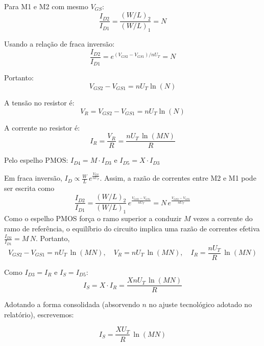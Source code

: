\documentclass[12pt,a4paper]{article}
\begin{document}
Para M1 e M2 com mesmo $V_{GS}$:
\begin{equation*}
\frac{I_{D2}}{I_{D1}} = \frac{(W/L)_2}{(W/L)_1} = N
\end{equation*}

Usando a relação de fraca inversão:
\begin{equation*}
\frac{I_{D2}}{I_{D1}} = e^{(V_{GS2} - V_{GS1})/nU_T} = N
\end{equation*}

Portanto:
\begin{equation*}
V_{GS2} - V_{GS1} = nU_T \ln(N)
\end{equation*}

A tensão no resistor é:
\begin{equation*}
V_R = V_{GS2} - V_{GS1} = nU_T \ln(N)
\end{equation*}

A corrente no resistor é:
\begin{equation*}
I_R = \frac{V_R}{R} = \frac{nU_T \,\ln(MN)}{R}
\end{equation*}

Pelo espelho PMOS: $I_{D4} = M \cdot I_{D3}$ e $I_{D5} = X \cdot I_{D3}$

Em fraca inversão, $I_D \propto \tfrac{W}{L}\,e^{\tfrac{V_{GS}}{nU_T}}$. Assim, a razão de correntes entre M2 e M1 pode ser escrita como
\begin{equation}
\frac{I_{D2}}{I_{D1}} = \frac{(W/L)_2}{(W/L)_1}\,e^{\tfrac{V_{GS2}-V_{GS1}}{nU_T}} = N\,e^{\tfrac{V_{GS2}-V_{GS1}}{nU_T}}
\end{equation}
Como o espelho PMOS força o ramo superior a conduzir $M$ vezes a corrente do ramo de referência, o equilíbrio do circuito implica uma razão de correntes efetiva $\tfrac{I_{D2}}{I_{D1}}=M\,N$. Portanto,
\begin{equation}
V_{GS2}-V_{GS1} = nU_T\,\ln(MN), \quad V_R = nU_T\,\ln(MN), \quad I_R = \frac{nU_T}{R}\,\ln(MN)
\end{equation}

Como $I_{D3} = I_R$ e $I_S = I_{D5}$:
\begin{equation}
I_S = X \cdot I_R = \frac{XnU_T \,\ln(MN)}{R}
\end{equation}

Adotando a forma consolidada (absorvendo $n$ no ajuste tecnológico adotado no relatório), escrevemos:

\begin{equation}
\boxed{I_S = \frac{XU_T}{R} \,\ln(MN)}
\end{equation}
\end{document}
